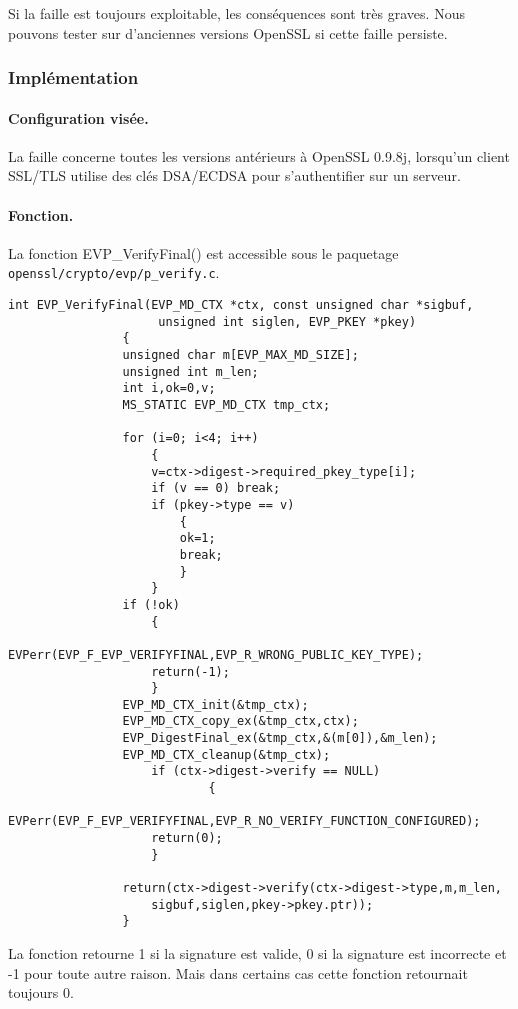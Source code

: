 		Si la faille est toujours exploitable, les conséquences sont très graves. Nous pouvons tester sur d'anciennes versions OpenSSL si cette faille persiste.
		
		\subsubsection{Implémentation}
			
			\paragraph{Configuration visée.\\}
			
			La faille concerne toutes les versions antérieurs à OpenSSL 0.9.8j, lorsqu'un client SSL/TLS utilise des clés DSA/ECDSA pour s'authentifier sur un serveur. 

			\paragraph{Fonction.\\}
			La fonction EVP\_VerifyFinal() est accessible sous le paquetage \texttt{openssl/crypto/evp/p\_verify.c}.
		
		
			\begin{lstlisting}[style=customc,caption=codeAleatoire.c, label=codeAleatoire]
				int EVP_VerifyFinal(EVP_MD_CTX *ctx, const unsigned char *sigbuf,
				     unsigned int siglen, EVP_PKEY *pkey)
				{
				unsigned char m[EVP_MAX_MD_SIZE];
				unsigned int m_len;
				int i,ok=0,v;
				MS_STATIC EVP_MD_CTX tmp_ctx;

				for (i=0; i<4; i++)
					{
					v=ctx->digest->required_pkey_type[i];
					if (v == 0) break;
					if (pkey->type == v)
						{
						ok=1;
						break;
						}
					}
				if (!ok)
					{
					EVPerr(EVP_F_EVP_VERIFYFINAL,EVP_R_WRONG_PUBLIC_KEY_TYPE);
					return(-1);
					}
				EVP_MD_CTX_init(&tmp_ctx);
				EVP_MD_CTX_copy_ex(&tmp_ctx,ctx);     
				EVP_DigestFinal_ex(&tmp_ctx,&(m[0]),&m_len);
				EVP_MD_CTX_cleanup(&tmp_ctx);
			        if (ctx->digest->verify == NULL)
			                {
					EVPerr(EVP_F_EVP_VERIFYFINAL,EVP_R_NO_VERIFY_FUNCTION_CONFIGURED);
					return(0);
					}

				return(ctx->digest->verify(ctx->digest->type,m,m_len,
					sigbuf,siglen,pkey->pkey.ptr));
				}
			\end{lstlisting}     

			La fonction retourne 1 si la signature est valide, 0 si la signature est incorrecte et -1 pour toute autre raison. Mais dans certains cas cette fonction retournait toujours 0.
	
